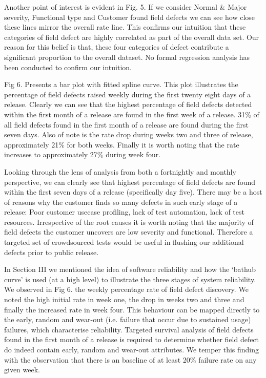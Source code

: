 Another point of interest is evident in Fig. 5. If we consider Normal \& Major severity, Functional type and Customer
found field defects we can see how close these lines mirror the overall rate line. This confirms our intuition that these
categories of field defect are highly correlated as part of the overall data set. Our reason for this belief is that, these four categories of defect contribute a significant proportion to the overall dataset. No formal regression analysis has been conducted to confirm our intuition. \par 

Fig 6. Presents a bar plot with fitted spline curve. This plot illustrates the percentage of field defects raised weekly during the first twenty eight days of a release. Clearly we can see that the highest percentage of field defects detected within the first month of a release are found in the first week of a release. 31\% of all field defects found in the first month of a release are found during the first seven days. Also of note is the rate drop during weeks two and three of release, approximately 21\% for both weeks. Finally it is worth noting that the rate increases to approximately 27\% during week four. \par 

Looking through the lens of analysis from both a fortnightly and monthly perspective, we can clearly see that highest
percentage of field defects are found within the first seven days of a release (specifically day five). There may be a host of reasons why the customer finds so many defects in such early stage of a release: Poor customer usecase profiling, lack of test automation, lack of test resources. Irrespective of the root causes it is worth noting that the majority of field defects the customer uncovers are low severity and functional. Therefore a targeted set of crowdsourced tests would be useful in flushing our additional defects prior to public release. \par 

In Section III we mentioned the idea of software reliability and how the `bathub curve' is used (at a high level) to illustrate the three stages of system reliability. We observed in Fig 6. the weekly percentage rate of field defect discovery. We noted the high initial rate in week one, the drop in weeks two and three and finally the increased rate in week four. This behaviour can be mapped directly to the early, random and wear-out (i.e. failure that occur due to sustained usage) failures, which characterise reliability. Targeted survival analysis of field defects found in the first month of a release is required to determine whether field defect do indeed contain early, random and wear-out attributes. We temper this finding with the observation that there is an baseline of at least 20\% failure rate on any given week.\par 

